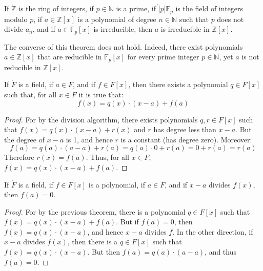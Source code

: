     \begin{theorem}
        If $\ring{\mathbb{Z}}$ is the ring of integers, if
        $p\in\mathbb{N}$ is a prime, if $\ring[p]{\mathbb{F}_{p}}$ is the
        field of integers modulo $p$, if $a\in\mathbb{Z}[x]$ is a polynomial
        of degree $n\in\mathbb{N}$ such that $p$ does not divide $a_{n}$,
        and if $\overline{a}\in\mathbb{F}_{p}[x]$ is irreducible, then
        $a$ is irreducible in $\mathbb{Z}[x]$.
    \end{theorem}
    The converse of this theorem does not hold. Indeed, there exist
    polynomials $a\in\mathbb{Z}[x]$ that are reducible in
    $\mathbb{F}_{p}[x]$ for every prime integer $p\in\mathbb{N}$, yet $a$
    is not reducible in $\mathbb{Z}[x]$.
    \begin{theorem}
        If $\ring{F}$ is a field, if $a\in{F}$, and if $f\in{F}[x]$, then
        there exists a polynomial $q\in{F}[x]$ such that, for all
        $x\in{F}$ it is true that:
        \begin{equation}
            f(x)=q(x)\cdot(x-a)+f(a)
        \end{equation}
    \end{theorem}
    \begin{proof}
        For by the division algorithm, there exists polynomials
        $q,r\in{F}[x]$ such that $f(x)=q(x)\cdot(x-a)+r(x)$ and $r$ has
        degree less than $x-a$. But the degree of $x-a$ is 1, and hence
        $r$ is a constant (has degree zero). Moreover:
        \begin{equation}
            f(a)=q(a)\cdot(a-a)+r(a)=q(a)\cdot{0}+r(a)=0+r(a)=r(a)
        \end{equation}
        Therefore $r(x)=f(a)$. Thus, for all $x\in{F}$,
        $f(x)=q(x)\cdot(x-a)+f(a)$.
    \end{proof}
    \begin{theorem}
        If $\ring{F}$ is a field, if $f\in{F}[x]$ is a polynomial, if
        $a\in{F}$, and if $x-a$ divides $f(x)$, then $f(a)=0$.
    \end{theorem}
    \begin{proof}
        For by the previous theorem, there is a polynomial $q\in{F}[x]$
        such that $f(x)=q(x)\cdot(x-a)+f(a)$. But if $f(a)=0$, then
        $f(x)=q(x)\cdot(x-a)$, and hence $x-a$ divides $f$. In the other
        direction, if $x-a$ divides $f(x)$, then there is a $q\in{F}[x]$
        such that $f(x)=q(x)\cdot(x-a)$. But then $f(a)=q(a)\cdot(a-a)$,
        and thus $f(a)=0$.
    \end{proof}
